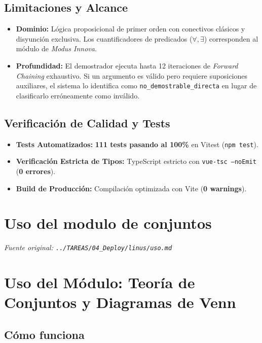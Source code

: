 \documentclass[11pt,a4paper,openany]{book}
\begin{document}
\hrulefill

\subsection{Limitaciones y Alcance}
\begin{itemize}[leftmargin=*]
\item \textbf{Dominio:} Lógica proposicional de primer orden con conectivos clásicos y disyunción exclusiva. Los cuantificadores de predicados ($\forall, \exists$) corresponden al módulo de \textit{Modus Innova}.
\item \textbf{Profundidad:} El demostrador ejecuta hasta 12 iteraciones de \textit{Forward Chaining} exhaustivo. Si un argumento es válido pero requiere suposiciones auxiliares, el sistema lo identifica como \texttt{no\_demostrable\_directa} en lugar de clasificarlo erróneamente como inválido.
\end{itemize}

\hrulefill

\subsection{Verificación de Calidad y Tests}
\begin{itemize}[leftmargin=*]
\item \textbf{Tests Automatizados:} \textbf{111 tests pasando al 100\%} en Vitest (\texttt{npm test}).
\item \textbf{Verificación Estricta de Tipos:} TypeScript estricto con \texttt{vue-tsc --noEmit} (\textbf{0 errores}).
\item \textbf{Build de Producción:} Compilación optimizada con Vite (\textbf{0 warnings}).
\end{itemize}


\section{Uso del modulo de conjuntos}
\textit{Fuente original: \texttt{../TAREAS/04\_Deploy/linus/uso.md}}

\section{Uso del Módulo: Teoría de Conjuntos y Diagramas de Venn}

\subsection{Cómo funciona}
\end{document}
